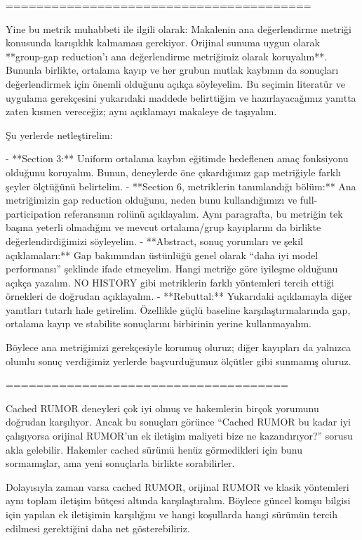 ========================================  

Yine bu metrik muhabbeti ile ilgili olarak: Makalenin ana değerlendirme metriği konusunda karışıklık kalmaması gerekiyor. Orijinal sunuma uygun olarak **group-gap reduction’ı ana değerlendirme metriğimiz olarak koruyalım**. Bununla birlikte, ortalama kayıp ve her grubun mutlak kaybının da sonuçları değerlendirmek için önemli olduğunu açıkça söyleyelim. Bu seçimin literatür ve uygulama gerekçesini yukarıdaki maddede belirttiğim ve hazırlayacağımız yanıtta zaten kısmen vereceğiz; aynı açıklamayı makaleye de taşıyalım.

Şu yerlerde netleştirelim:

- **Section 3:** Uniform ortalama kaybın eğitimde hedeflenen amaç fonksiyonu olduğunu koruyalım. Bunun, deneylerde öne çıkardığımız gap metriğiyle farklı şeyler ölçtüğünü belirtelim.
- **Section 6, metriklerin tanımlandığı bölüm:** Ana metriğimizin gap reduction olduğunu, neden bunu kullandığımızı ve full-participation referansının rolünü açıklayalım. Aynı paragrafta, bu metriğin tek başına yeterli olmadığını ve mevcut ortalama/grup kayıplarını da birlikte değerlendirdiğimizi söyleyelim.
- **Abstract, sonuç yorumları ve şekil açıklamaları:** Gap bakımından üstünlüğü genel olarak “daha iyi model performansı” şeklinde ifade etmeyelim. Hangi metriğe göre iyileşme olduğunu açıkça yazalım. NO HISTORY gibi metriklerin farklı yöntemleri tercih ettiği örnekleri de doğrudan açıklayalım.
- **Rebuttal:** Yukarıdaki açıklamayla diğer yanıtları tutarlı hale getirelim. Özellikle güçlü baseline karşılaştırmalarında gap, ortalama kayıp ve stabilite sonuçlarını birbirinin yerine kullanmayalım.

Böylece ana metriğimizi gerekçesiyle korumuş oluruz; diğer kayıpları da yalnızca olumlu sonuç verdiğimiz yerlerde başvurduğumuz ölçütler gibi sunmamış oluruz.

=====================================

Cached RUMOR deneyleri çok iyi olmuş ve hakemlerin birçok yorumunu doğrudan karşılıyor. Ancak bu sonuçları görünce “Cached RUMOR bu kadar iyi çalışıyorsa orijinal RUMOR’un ek iletişim maliyeti bize ne kazandırıyor?” sorusu akla gelebilir. Hakemler cached sürümü henüz görmedikleri için bunu sormamışlar, ama yeni sonuçlarla birlikte sorabilirler.

Dolayısıyla zaman varsa cached RUMOR, orijinal RUMOR ve klasik yöntemleri aynı toplam iletişim bütçesi altında karşılaştıralım. Böylece güncel komşu bilgisi için yapılan ek iletişimin karşılığını ve hangi koşullarda hangi sürümün tercih edilmesi gerektiğini daha net gösterebiliriz.

